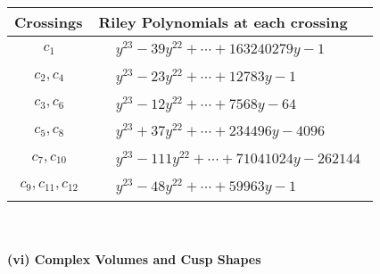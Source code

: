 \documentclass[1p]{elsarticle_modified}
\theoremstyle{definition}
\begin{document}
\begin{tabular}{m{50pt}|m{274pt}}
Crossings & \hspace{64pt}Riley Polynomials at each crossing \\
\hline $$\begin{aligned}c_{1}\end{aligned}$$&$\begin{aligned}
&y^{23}-39 y^{22}+\cdots+163240279 y-1
\end{aligned}$\\
\hline $$\begin{aligned}c_{2},c_{4}\end{aligned}$$&$\begin{aligned}
&y^{23}-23 y^{22}+\cdots+12783 y-1
\end{aligned}$\\
\hline $$\begin{aligned}c_{3},c_{6}\end{aligned}$$&$\begin{aligned}
&y^{23}-12 y^{22}+\cdots+7568 y-64
\end{aligned}$\\
\hline $$\begin{aligned}c_{5},c_{8}\end{aligned}$$&$\begin{aligned}
&y^{23}+37 y^{22}+\cdots+234496 y-4096
\end{aligned}$\\
\hline $$\begin{aligned}c_{7},c_{10}\end{aligned}$$&$\begin{aligned}
&y^{23}-111 y^{22}+\cdots+71041024 y-262144
\end{aligned}$\\
\hline $$\begin{aligned}c_{9},c_{11},c_{12}\end{aligned}$$&$\begin{aligned}
&y^{23}-48 y^{22}+\cdots+59963 y-1
\end{aligned}$\\
\hline
\end{tabular}\\~\\
\newpage\flushleft \textbf{(vi) Complex Volumes and Cusp Shapes}
\end{document}

